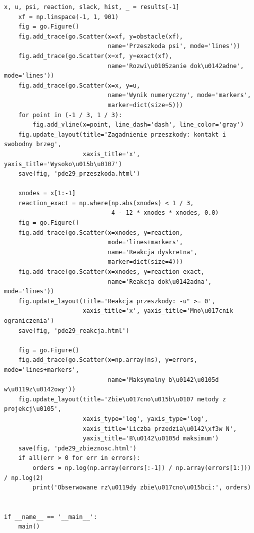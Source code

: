 \begin{lstlisting}[style=pythonpde,caption={Przeszkoda, reakcja i zbieżność schematu (Plotly)},label={code:pde29-plotly}]
    x, u, psi, reaction, slack, hist, _ = results[-1]
    xf = np.linspace(-1, 1, 901)
    fig = go.Figure()
    fig.add_trace(go.Scatter(x=xf, y=obstacle(xf),
                             name='Przeszkoda psi', mode='lines'))
    fig.add_trace(go.Scatter(x=xf, y=exact(xf),
                             name='Rozwi\u0105zanie dok\u0142adne', mode='lines'))
    fig.add_trace(go.Scatter(x=x, y=u,
                             name='Wynik numeryczny', mode='markers',
                             marker=dict(size=5)))
    for point in (-1 / 3, 1 / 3):
        fig.add_vline(x=point, line_dash='dash', line_color='gray')
    fig.update_layout(title='Zagadnienie przeszkody: kontakt i swobodny brzeg',
                      xaxis_title='x', yaxis_title='Wysoko\u015b\u0107')
    save(fig, 'pde29_przeszkoda.html')

    xnodes = x[1:-1]
    reaction_exact = np.where(np.abs(xnodes) < 1 / 3,
                              4 - 12 * xnodes * xnodes, 0.0)
    fig = go.Figure()
    fig.add_trace(go.Scatter(x=xnodes, y=reaction,
                             mode='lines+markers',
                             name='Reakcja dyskretna',
                             marker=dict(size=4)))
    fig.add_trace(go.Scatter(x=xnodes, y=reaction_exact,
                             name='Reakcja dok\u0142adna', mode='lines'))
    fig.update_layout(title='Reakcja przeszkody: -u" >= 0',
                      xaxis_title='x', yaxis_title='Mno\u017cnik ograniczenia')
    save(fig, 'pde29_reakcja.html')

    fig = go.Figure()
    fig.add_trace(go.Scatter(x=np.array(ns), y=errors, mode='lines+markers',
                             name='Maksymalny b\u0142\u0105d w\u0119z\u0142owy'))
    fig.update_layout(title='Zbie\u017cno\u015b\u0107 metody z projekcj\u0105',
                      xaxis_type='log', yaxis_type='log',
                      xaxis_title='Liczba przedzia\u0142\xf3w N',
                      yaxis_title='B\u0142\u0105d maksimum')
    save(fig, 'pde29_zbieznosc.html')
    if all(err > 0 for err in errors):
        orders = np.log(np.array(errors[:-1]) / np.array(errors[1:])) / np.log(2)
        print('Obserwowane rz\u0119dy zbie\u017cno\u015bci:', orders)


if __name__ == '__main__':
    main()
\end{lstlisting}

